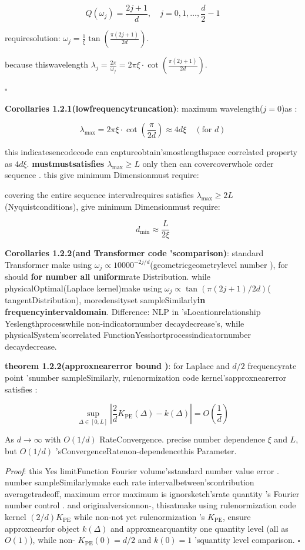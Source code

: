 \documentclass[
  12pt,
]{article}
\begin{document}
\[Q(\omega_j) = \frac{2j+1}{d}, \quad j = 0, 1, \ldots, \frac{d}{2}-1\]

requiresolution: \(\omega_j = \frac{1}{\xi} \tan\left(\frac{\pi(2j+1)}{2d}\right)\). 

because thiswavelength
\(\lambda_j = \frac{2\pi}{\omega_j} = 2\pi\xi \cdot \cot\left(\frac{\pi(2j+1)}{2d}\right)\). 

\(\square\)

\textbf{Corollaries 1.2.1(lowfrequencytruncation)}: maximum wavelength(\(j=0\))as : 

\[\lambda_{\max} = 2\pi\xi \cdot \cot\left(\frac{\pi}{2d}\right) \approx 4d\xi \quad (\text{for  } d)\]

this indicatesencodecode can captureobtain'smostlengthspace correlated property as  \(4d\xi\). \textbf{mustmustsatisfies 
\(\lambda_{\max} \geq L\)} only then can covercoverwhole order sequence . this give minimum Dimensionmust require: 

covering the entire sequence intervalrequires satisfies 
\(\lambda_{\max} \geq 2L\)(Nyquistconditions), give minimum Dimensionmust require: 

\[\boxed{d_{\min} \approx \frac{L}{2\xi}}\]

\textbf{Corollaries 1.2.2(and  Transformer code 'scomparison)}: standard  Transformer make using 
\(\omega_j \propto 10000^{-2j/d}\)(geometricgeometrylevel number ), for should \textbf{for number all uniform}rate Distribution. while physicalOptimal(Laplace
kernel)make using 
\(\omega_j \propto \tan(\pi(2j+1)/2d)\)( tangentDistribution), moredensityset sampleSimilarly\textbf{in frequencyintervaldomain}. Difference: NLP
in 'sLocationrelationship Yeslengthprocesswhile non-indicatornumber decaydecrease's, while physicalSystem'scorrelated FunctionYesshortprocessindicatornumber decaydecrease. 

\textbf{theorem  1.2.2(approxnearerror bound )}: for  Laplace and  \(d/2\)
frequencyrate point 'snumber sampleSimilarly, rulenormization code kernel'sapproxnearerror satisfies : 

\[\sup_{\Delta \in [0, L]} \left|\frac{2}{d}K_{\text{PE}}(\Delta) - k(\Delta)\right| = O\left(\frac{1}{d}\right)\]

As \(d \to \infty\) with  \(O(1/d)\) RateConvergence. precise number dependence \(\xi\) and 
\(L\), but  \(O(1/d)\) 'sConvergenceRatenon-dependencethis Parameter. 

\emph{Proof}: this Yes limitFunction Fourier
volume'sstandard number value error . number sampleSimilarlymake each rate intervalbetween'scontribution averagetradeoff, maximum error maximum is ignorsketch'srate quantity 's
Fourier number control . and originalversionnon-, thisatmake using rulenormization code kernel
\((2/d)K_{\text{PE}}\) while non-not yet rulenormization 's \(K_{\text{PE}}\), ensure approxnearfor object
\(k(\Delta)\) and approxnearquantity one quantity level (all as  \(O(1)\)), while non-
\(K_{\text{PE}}(0)=d/2\) and  \(k(0)=1\) 'squantity level comparison. \(\square\)
\end{document}
